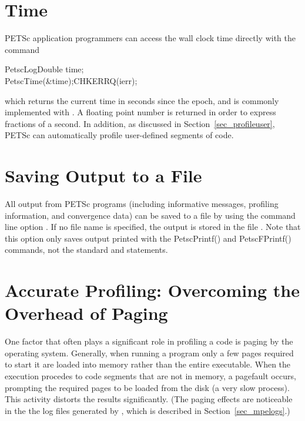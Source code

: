{{%
\section{Time}

PETSc application programmers can access the wall clock time directly
with the command 
\begin{tabbing}
  PetscLogDouble time;\\
  PetscTime(\&time);CHKERRQ(ierr);
\end{tabbing}
which returns the current time in seconds since the epoch, and is commonly
implemented with . A floating point number is returned in order
to express fractions of a second. In addition, as discussed in Section~\ref{sec_profileuser},
PETSc can automatically profile user-defined segments of code.

\section{Saving Output to a File}

All output from PETSc programs (including informative messages, profiling information,
and convergence data) can be saved to a file by using the command line
option . 
If no file name is specified, the output is stored in the file .
 Note that this option only saves output printed with
the PetscPrintf() and PetscFPrintf() commands, not the
standard  and  statements.

\section{Accurate Profiling: Overcoming the Overhead of Paging}
\label{sec_profaccuracy}

One factor that often plays a significant role in profiling a code is
paging by the operating system.  Generally, when running a program
only a few pages required to start it are loaded into memory rather
than the entire executable.  When the execution procedes to code
segments that are not in memory, a pagefault occurs, prompting the
required pages to be loaded from the disk (a very slow process).  This
activity distorts the results significantly. (The paging effects are
noticeable in the the log files generated by , which is
described in Section~\ref{sec_mpelogs}.)

}}
